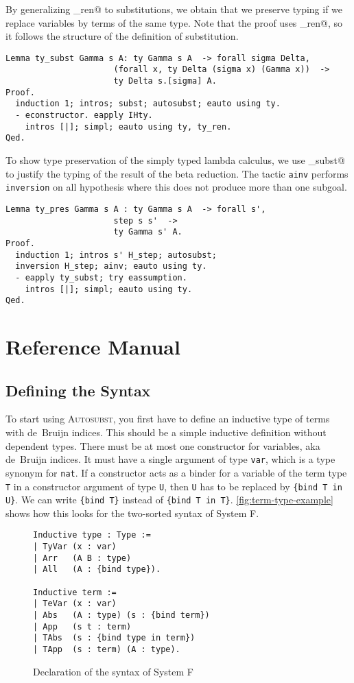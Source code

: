 \documentclass{scrartcl}
\newcommand{\Autosubst}{\textsc{Autosubst}\xspace}
\newcommand{\lst}{\lstinline}
\begin{document}
By generalizing \lst@ty_ren@ to substitutions, we obtain that we preserve typing if we replace variables by terms of the same type. Note that the proof uses \lst@ty_ren@, so it follows the structure of the definition of substitution.
\begin{lstlisting}
Lemma ty_subst Gamma s A: ty Gamma s A  -> forall sigma Delta,
                      (forall x, ty Delta (sigma x) (Gamma x))  ->
                      ty Delta s.[sigma] A.
Proof.
  induction 1; intros; subst; autosubst; eauto using ty. 
  - econstructor. eapply IHty.
    intros [|]; simpl; eauto using ty, ty_ren.
Qed.
\end{lstlisting}

To show type preservation of the simply typed lambda calculus, we use \lst@ty_subst@ to justify the typing of the result of the beta reduction.
The tactic \lst$ainv$ performs \lst$inversion$ on all hypothesis where this does not produce more than one subgoal.
\begin{lstlisting}
Lemma ty_pres Gamma s A : ty Gamma s A  -> forall s', 
                      step s s'  -> 
                      ty Gamma s' A.
Proof.
  induction 1; intros s' H_step; autosubst;
  inversion H_step; ainv; eauto using ty.
  - eapply ty_subst; try eassumption.
    intros [|]; simpl; eauto using ty.
Qed.      
\end{lstlisting}

\section{Reference Manual}
\label{sec:manual}

\subsection{Defining the Syntax}
\label{sec:defining-syntax}

To start using \Autosubst, you first have to define an inductive type of terms with de~Bruijn indices.
This should be a simple inductive definition without dependent types.
There must be at most one constructor for variables, aka de~Bruijn indices. It must have a single argument of type \lst$var$, which is a type synonym for \lst$nat$.
If a constructor acts as a binder for a variable of the term type \lst$T$ in a constructor argument of type \lst$U$, then \lst$U$ has to be replaced by \lst${bind T in U}$.
We can write \lst${bind T}$ instead of \lst${bind T in T}$.
\autoref{fig:term-type-example} shows how this looks for the two-sorted syntax of System F. 
\begin{figure}
  \centering
  \begin{lstlisting}
Inductive type : Type :=
| TyVar (x : var)
| Arr   (A B : type)
| All   (A : {bind type}).

Inductive term :=
| TeVar (x : var)
| Abs   (A : type) (s : {bind term})
| App   (s t : term)
| TAbs  (s : {bind type in term})
| TApp  (s : term) (A : type).
\end{lstlisting}
  \caption{Declaration of the syntax of System F}
  \label{fig:term-type-example}
\end{figure}
\end{document}
